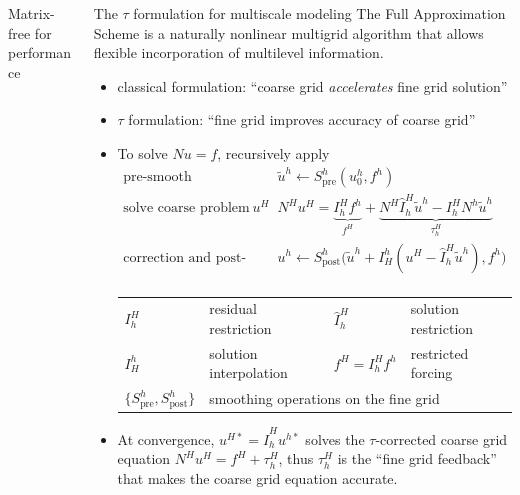 \documentclass[final,t]{beamer}
\begin{document}
\begin{frame}{}
\begin{columns}
\begin{column}{0.31\textwidth}
\begin{block}{Matrix-free for performance}
\begin{table}
        \end{table}
      \end{block}
    \end{column}
    \begin{column}{0.31\textwidth}
      \begin{block}{The $\tau$ formulation for multiscale modeling}
        The Full Approximation Scheme is a naturally nonlinear multigrid algorithm that allows flexible incorporation of multilevel information.
        \begin{itemize}
        \item classical formulation: ``coarse grid \emph{accelerates} fine grid solution''
        \item $\tau$ formulation: ``fine grid improves accuracy of coarse grid''
        \item To solve $N u = f$, recursively apply
          \begin{equation*}
            \begin{split}
              \text{pre-smooth} \:\: & \quad \tilde u^h \gets S^h_{\text{pre}}(u^h_0, f^h) \\
              \text{solve coarse problem for $u^H$} \:\: & \quad N^H u^H = \underbrace{I_h^H f^h}_{f^H} + \underbrace{N^H \hat I_h^H \tilde u^h - I_h^H N^h \tilde u^h}_{\tau_h^H} \\
              \text{correction and post-smooth} \:\: & \quad u^h \gets S^h_{\text{post}} \Big( \tilde u^h + I_H^h (u^H - \hat I_h^H \tilde u^h), f^h \Big) \\
            \end{split}
          \end{equation*}
          \begin{tabular}{llll}
            \toprule
            $I_h^H$ & residual restriction & $\hat I_h^H$ & solution restriction \\
            $I_H^h$ & solution interpolation & $f^H = I_h^H f^h$ & restricted forcing \\
            $\{S^h_{\text{pre}},S^h_{\text{post}}\}$ & \multicolumn{3}{l}{smoothing operations on the fine grid} \\
            \bottomrule
          \end{tabular}
        \item At convergence, $u^{H*} = \hat I_h^H u^{h*}$ solves the $\tau$-corrected coarse grid equation
            $N^H u^H = f^H + \tau_h^H$,
          thus $\tau_h^H$ is the ``fine grid feedback'' that makes the coarse grid equation accurate.

\end{itemize}
\end{block}
\end{column}
\end{columns}
\end{frame}
\end{document}
